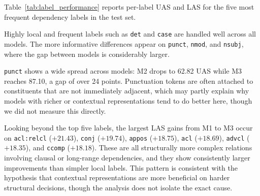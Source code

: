\documentclass[12pt,letterpaper]{article}
\begin{document}
Table~\ref{tab:label_performance} reports per-label UAS and LAS for the five most frequent dependency labels in the test set.

\begin{table}[ht]
\centering
\caption{Per-label UAS / LAS (\%) for the five most frequent labels in the test set.}
\label{tab:label_performance}
\end{table}
\FloatBarrier
Highly local and frequent labels such as \texttt{det} and \texttt{case} are handled well across all models. The more informative differences appear on \texttt{punct}, \texttt{nmod}, and \texttt{nsubj}, where the gap between models is considerably larger.

\texttt{punct} shows a wide spread across models: M2 drops to 62.82 UAS while M3 reaches 87.10, a gap of over 24 points. Punctuation tokens are often attached to constituents that are not immediately adjacent, which may partly explain why models with richer or contextual representations tend to do better here, though we did not measure this directly.

Looking beyond the top five labels, the largest LAS gains from M1 to M3 occur on \texttt{acl:relcl} ($+21.43$), \texttt{conj} ($+19.74$), \texttt{appos} ($+18.75$), \texttt{acl} ($+18.69$), \texttt{advcl} ($+18.35$), and \texttt{ccomp} ($+18.18$). These are all structurally more complex relations involving clausal or long-range dependencies, and they show consistently larger improvements than simpler local labels. This pattern is consistent with the hypothesis that contextual representations are more beneficial on harder structural decisions, though the analysis does not isolate the exact cause.
\end{document}

